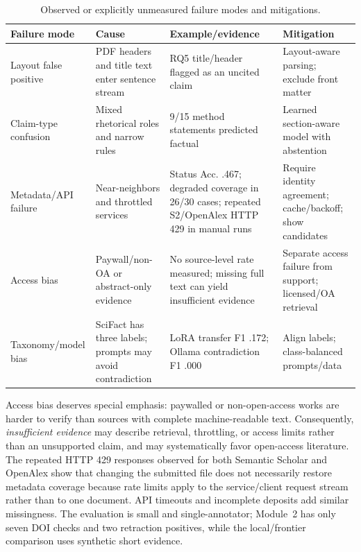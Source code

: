 \documentclass[12pt,toc=bib,toc=listof]{scrartcl}
\begin{document}
\begin{table}[H]
\centering
\scriptsize
\setlength{\tabcolsep}{3pt}
\begin{tabularx}{\textwidth}{@{}P{2.25cm}P{3cm}YP{3.2cm}@{}}
\toprule
\textbf{Failure mode} & \textbf{Cause} & \textbf{Example/evidence} & \textbf{Mitigation} \\
\midrule
Layout false positive & PDF headers and title text enter sentence stream & RQ5 title/header flagged as an uncited claim & Layout-aware parsing; exclude front matter \\
Claim-type confusion & Mixed rhetorical roles and narrow rules & 9/15 method statements predicted factual & Learned section-aware model with abstention \\
Metadata/API failure & Near-neighbors and throttled services & Status Acc. .467; degraded coverage in 26/30 cases; repeated S2/OpenAlex HTTP 429 in manual runs & Require identity agreement; cache/backoff; show candidates \\
Access bias & Paywall/non-OA or abstract-only evidence & No source-level rate measured; missing full text can yield insufficient evidence & Separate access failure from support; licensed/OA retrieval \\
Taxonomy/model bias & SciFact has three labels; prompts may avoid contradiction & LoRA transfer F1 .172; Ollama contradiction F1 .000 & Align labels; class-balanced prompts/data \\
\bottomrule
\end{tabularx}
\caption{Observed or explicitly unmeasured failure modes and mitigations.}
\label{tab:failure_modes}
\end{table}

Access bias deserves special emphasis: paywalled or non-open-access works are harder to verify than sources with complete machine-readable text. Consequently, \emph{insufficient evidence} may describe retrieval, throttling, or access limits rather than an unsupported claim, and may systematically favor open-access literature. The repeated HTTP 429 responses observed for both Semantic Scholar and OpenAlex show that changing the submitted file does not necessarily restore metadata coverage because rate limits apply to the service/client request stream rather than to one document. API timeouts and incomplete deposits add similar missingness. The evaluation is small and single-annotator; Module~2 has only seven DOI checks and two retraction positives, while the local/frontier comparison uses synthetic short evidence.
\end{document}
